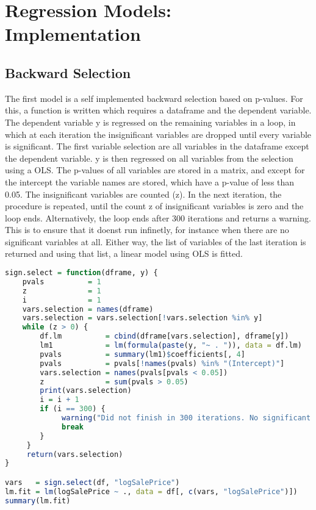 


\section{Regression Models: Implementation}
\subsection{Backward Selection}
The first model is a self implemented backward selection based on p-values. For this, a function is written which requires a dataframe and the dependent variable. The dependent variable y is regressed on the remaining variables 
in a loop, in which at each iteration the insignificant variables
are dropped until every variable is significant. 
The first variable selection are all variables in the dataframe except the dependent variable. y is then regressed on all variables from the selection using a OLS. The p-values of all variables are stored in a matrix, and except
for the intercept the variable names are stored, which have a p-value
of less than 0.05. The insignificant variables are counted (z).  In the next iteration, the procedure is repeated,
until the count z of insignificant variables is zero and the loop
ends. Alternatively, the loop ends after 300 iterations and returns a warning. This is to ensure
that it doenst run infinetly, for instance when there are no significant variables at all. 
Either way, the list of variables of the last iteration is returned and using that list,  a linear model using OLS is fitted. 


\begin{lstlisting}[language=R]
sign.select = function(dframe, y) {
    pvals          = 1
    z              = 1
    i              = 1
    vars.selection = names(dframe)
    vars.selection = vars.selection[!vars.selection %in% y]
    while (z > 0) {
        df.lm          = cbind(dframe[vars.selection], dframe[y])
        lm1            = lm(formula(paste(y, "~ . ")), data = df.lm)
        pvals          = summary(lm1)$coefficients[, 4]
        pvals          = pvals[!names(pvals) %in% "(Intercept)"]
        vars.selection = names(pvals[pvals < 0.05])
        z              = sum(pvals > 0.05)
        print(vars.selection)
        i = i + 1
        if (i == 300) {
             warning("Did not finish in 300 iterations. No significant variables in data set?")
             break
        }
     }
     return(vars.selection)
}

vars   = sign.select(df, "logSalePrice")
lm.fit = lm(logSalePrice ~ ., data = df[, c(vars, "logSalePrice")])
summary(lm.fit)
\end{lstlisting}
